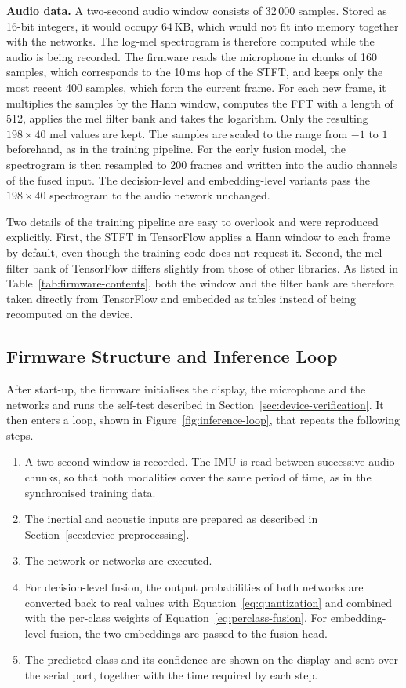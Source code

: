 \textbf{Audio data.} A two-second audio window consists of 32\,000 samples. Stored
as 16-bit integers, it would occupy 64\,KB, which would not fit into memory
together with the networks. The log-mel spectrogram is therefore computed while
the audio is being recorded. The firmware reads the microphone in chunks of 160
samples, which corresponds to the 10\,ms hop of the STFT, and keeps only the most
recent 400 samples, which form the current frame. For each new frame, it
multiplies the samples by the Hann window, computes the FFT with a length of 512,
applies the mel filter bank and takes the logarithm. Only the resulting
$198 \times 40$ mel values are kept. The samples are scaled to the range from $-1$
to $1$ beforehand, as in the training pipeline. For the early fusion model, the
spectrogram is then resampled to 200 frames and written into the audio channels
of the fused input. The decision-level and embedding-level variants pass the
$198 \times 40$ spectrogram to the audio network unchanged.

Two details of the training pipeline are easy to overlook and were reproduced
explicitly. First, the STFT in TensorFlow applies a Hann window to each frame by
default, even though the training code does not request it. Second, the mel
filter bank of TensorFlow differs slightly from those of other libraries. As
listed in Table~\ref{tab:firmware-contents}, both the window and the filter bank
are therefore taken directly from TensorFlow and embedded as tables instead of
being recomputed on the device.

\subsection{Firmware Structure and Inference Loop}
\label{sec:firmware-loop}

After start-up, the firmware initialises the display, the microphone and the
networks and runs the self-test described in Section~\ref{sec:device-verification}.
It then enters a loop, shown in Figure~\ref{fig:inference-loop}, that repeats the
following steps.

\begin{enumerate}
  \item A two-second window is recorded. The IMU is read between successive audio
  chunks, so that both modalities cover the same period of time, as in the
  synchronised training data.
  \item The inertial and acoustic inputs are prepared as described in
  Section~\ref{sec:device-preprocessing}.
  \item The network or networks are executed.
  \item For decision-level fusion, the output probabilities of both networks are
  converted back to real values with Equation~\ref{eq:quantization} and combined
  with the per-class weights of Equation~\ref{eq:perclass-fusion}. For
  embedding-level fusion, the two embeddings are passed to the fusion head.
  \item The predicted class and its confidence are shown on the display and sent
  over the serial port, together with the time required by each step.
\end{enumerate}

